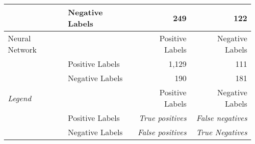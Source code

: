 \begin{tabular}{llrr}
                                        & Negative Labels           & 249                       & 122                       \\
    \midrule
    Neural Network                      &                           & Positive Labels           & Negative Labels           \\
                                        & Positive Labels           & 1,129                     & 111                       \\
                                        & Negative Labels           & 190                       & 181                       \\
    \midrule
    \textit{Legend}                     &                           & Positive Labels           & Negative Labels            \\
                                        & Positive Labels           & \textit{True positives}   & \textit{False negatives}   \\
                                        & Negative Labels           & \textit{False positives}  & \textit{True Negatives}    \\
    \bottomrule
\end{tabular}